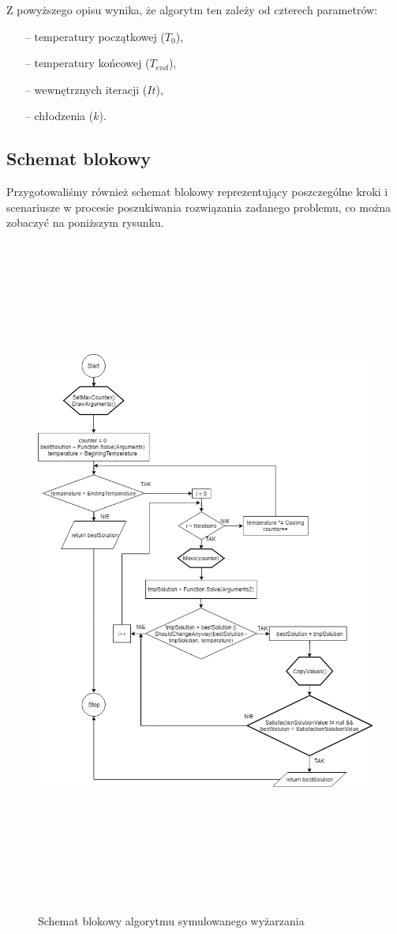 \documentclass[twoside]{projektInzynierskiMS1}
\newcommand{\si}{ś}
\begin{document}
Z powyższego opisu wynika, że algorytm ten zależy od czterech parametrów:
\begin{itemize}
	\item[--] temperatury początkowej ($T_0$),
	\item[--] temperatury końcowej ($T_{end}$),
	\item[--] wewnętrznych iteracji ($It$),
	\item[--] chłodzenia ($k$).
\end{itemize}

\subsection{Schemat blokowy}
Przygotowali\si my również schemat blokowy reprezentujący poszczególne kroki i scenariusze w procesie poszukiwania rozwiązania zadanego problemu, co można zobaczyć na poniższym rysunku.

\begin{figure}[H]
		\includegraphics[height=22cm, width=16cm]{pics/blockDiagram.png}\\
	\caption{Schemat blokowy algorytmu symulowanego wyżarzania}
\end{figure}
\end{document}

